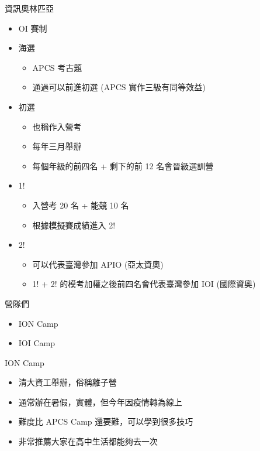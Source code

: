 \documentclass[aspectratio=169]{beamer}
\begin{document}
	\begin{frame}{資訊奧林匹亞}
		\begin{itemize}
			\item<1-> OI 賽制
			\item<2-> 海選
				\begin{itemize}
					\item APCS 考古題
					\item 通過可以前進初選 (APCS 實作三級有同等效益)
				\end{itemize}
			\item<3-> 初選
				\begin{itemize}
					\item 也稱作入營考
					\item 每年三月舉辦
					\item 每個年級的前四名 + 剩下的前 12 名會晉級選訓營
				\end{itemize}
			\item<4-> 1!
				\begin{itemize}
					\item 入營考 20 名 + 能競 10 名
					\item 根據模擬賽成績進入 2!
				\end{itemize}
			\item<5-> 2!
				\begin{itemize}
					\item 可以代表臺灣參加 APIO (亞太資奧)
					\item 1! + 2! 的模考加權之後前四名會代表臺灣參加 IOI (國際資奧)
				\end{itemize}
			
		\end{itemize}
	\end{frame}

	\begin{frame}{營隊們}
		\begin{itemize}
			\item ION Camp
			\item IOI Camp
		\end{itemize}
	\end{frame}

	\begin{frame}{ION Camp}
		\begin{itemize}
			\item 清大資工舉辦，俗稱離子營
			\item 通常辦在暑假，實體，但今年因疫情轉為線上
			\item 難度比 APCS Camp 還要難，可以學到很多技巧
			\item 非常推薦大家在高中生活都能夠去一次
		\end{itemize}
	\end{frame}
\end{document}
